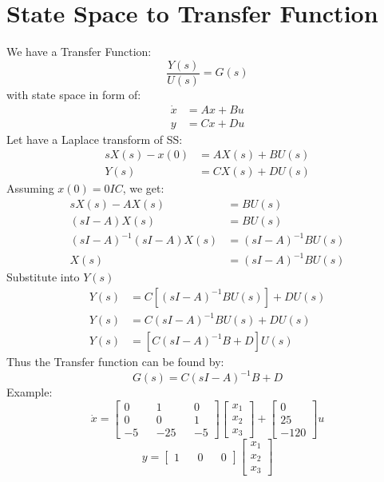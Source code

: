 \documentclass[12pt,a4paper]{article}
\begin{document}
	\section{State Space to Transfer Function}
	We have a Transfer Function:
	\[
	\frac{Y(s)}{U(s)} = G(s)
	\]
	with state space in form of:
	\[
	\begin{split}
		\dot{x} &= Ax + Bu \\
		y &= Cx + Du
	\end{split}
	\]
	Let have a Laplace transform of SS:
	\[
	\begin{split}
		sX(s)-x(0) &= AX(s) + BU(s) \\
		Y(s) &= CX(s) + DU(s)
	\end{split}
	\]
	Assuming \(x(0) = 0 IC\), we get:
	\[
	\begin{split}
		sX(s) - AX(s) &= BU(s) \\
		(sI - A)X(s) &= BU(s) \\
		(sI - A)^{-1}(sI - A)X(s) &= (sI - A)^{-1}BU(s) \\
		X(s) &= (sI - A)^{-1}BU(s)
	\end{split}
	\]
	Substitute into \(Y(s)\)
	\[
	\begin{split}
		Y(s) &= C[(sI - A)^{-1}BU(s)] + DU(s) \\
		Y(s) &= C(sI - A)^{-1}BU(s) + DU(s) \\
		Y(s) &= [C(sI - A)^{-1}B + D]U(s)
	\end{split}
	\]
	Thus the Transfer function can be found by:
	\[
	G(s) = C(sI - A)^{-1}B + D
	\]
	Example:
	\[
	\dot{x} = 
	\begin{bmatrix}
		0  &   & 1   &   & 0  \\
		0  &   & 0   &   & 1  \\
		-5 &   & -25 &   & -5 
	\end{bmatrix}
	\begin{bmatrix}
		x_1 \\
		x_2 \\
		x_3 
	\end{bmatrix} + 
	\begin{bmatrix}
		0    \\
		25   \\
		-120 
	\end{bmatrix} u
	\]
	\[
	y =
	\begin{bmatrix}
		1 &   & 0 &   & 0 
	\end{bmatrix}
	\begin{bmatrix}
		x_1 \\
		x_2 \\
		x_3 
	\end{bmatrix}
	\]
	
\end{document}
